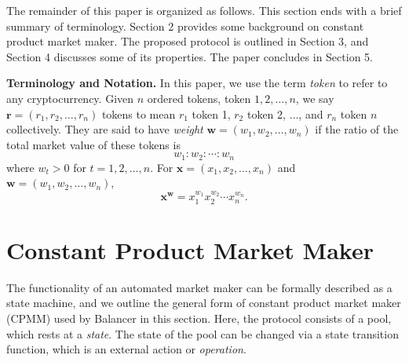 \documentclass[12pt,a4paper]{article}
\begin{document}
The remainder of this paper is organized as follows. This section ends with a brief summary of terminology. Section 2 provides some background on constant product market maker. The proposed protocol is outlined in Section 3, and Section 4 discusses some of its properties. The paper concludes in Section 5.

\textbf{Terminology and Notation.} In this paper, we use the term \emph{token} to refer to any cryptocurrency. Given $n$ ordered tokens, token $1,2,\ldots,n$, we say $\mathbf{r}=(r_1,r_2,\ldots,r_n)$ tokens to mean $r_1$ token 1, $r_2$ token 2, $\ldots$, and $r_n$ token $n$ collectively. They are said to have \emph{weight} $\mathbf{w}=(w_1,w_2,\ldots,w_n)$ if the ratio of the total market value of these tokens is 
\[w_1:w_2:\cdots:w_n\]
where $w_t>0$ for $t=1,2,\ldots,n$. For $\mathbf{x}=(x_1,x_2,\ldots,x_n)$ and $\mathbf{w}=(w_1,w_2,\ldots,w_n)$,
\[\mathbf{x}^\mathbf{w}=x_1^{w_1}x_2^{w_2}\cdots x_n^{w_n}.\]


\section{Constant Product Market Maker}


The functionality of an automated market maker can be formally described as a state machine, and we outline the general form of constant product market maker (CPMM) used by Balancer \cite{MM} in this section. Here, the protocol consists of a pool, which rests at a \emph{state}. The state of the pool can be changed via a state transition function, which is an external action or \emph{operation}.
\end{document}
